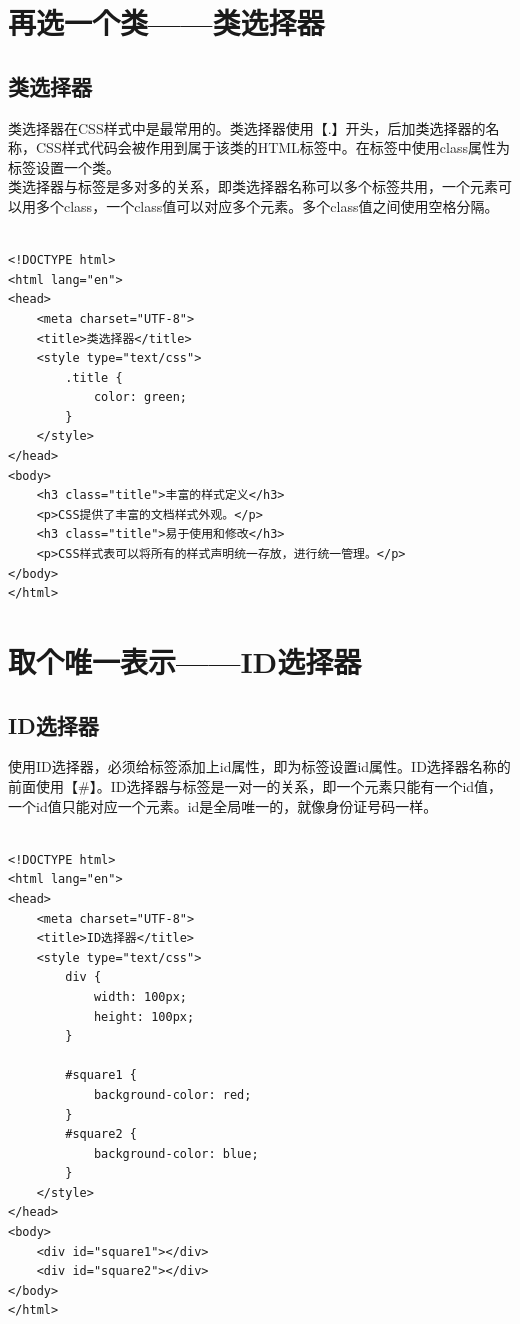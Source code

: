 \newpage

\section{再选一个类——类选择器}

\subsection{类选择器}

类选择器在CSS样式中是最常用的。类选择器使用【.】开头，后加类选择器的名称，CSS样式代码会被作用到属于该类的HTML标签中。在标签中使用class属性为标签设置一个类。 \\

类选择器与标签是多对多的关系，即类选择器名称可以多个标签共用，一个元素可以用多个class，一个class值可以对应多个元素。多个class值之间使用空格分隔。 \\

 \\

\begin{lstlisting}[style=htmlcssjs]
<!DOCTYPE html>
<html lang="en">
<head>
    <meta charset="UTF-8">
    <title>类选择器</title>
    <style type="text/css">
        .title {
            color: green;
        }
    </style>
</head>
<body>
    <h3 class="title">丰富的样式定义</h3>
    <p>CSS提供了丰富的文档样式外观。</p>
    <h3 class="title">易于使用和修改</h3>
    <p>CSS样式表可以将所有的样式声明统一存放，进行统一管理。</p>
</body>
</html>
\end{lstlisting}

\newpage

\section{取个唯一表示——ID选择器}

\subsection{ID选择器}

使用ID选择器，必须给标签添加上id属性，即为标签设置id属性。ID选择器名称的前面使用【\#】。ID选择器与标签是一对一的关系，即一个元素只能有一个id值，一个id值只能对应一个元素。id是全局唯一的，就像身份证号码一样。 \\

 \\

\begin{lstlisting}[style=htmlcssjs]
<!DOCTYPE html>
<html lang="en">
<head>
    <meta charset="UTF-8">
    <title>ID选择器</title>
    <style type="text/css">
        div {
            width: 100px;
            height: 100px;
        }

        #square1 {
            background-color: red;
        }
        #square2 {
            background-color: blue;
        }
    </style>
</head>
<body>
    <div id="square1"></div>
    <div id="square2"></div>
</body>
</html>
\end{lstlisting}

